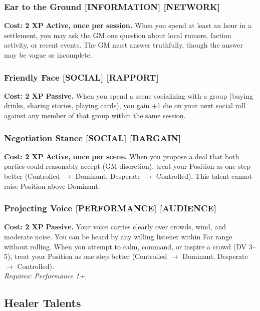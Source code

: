 \documentclass[12pt,a4paper]{book}
\begin{document}
\subsubsection*{Ear to the Ground \textnormal{[INFORMATION] [NETWORK]}}
\label{talent:ear-to-the-ground}
\textbf{Cost: 2 XP} \textbf{Active, once per session.} When you spend at least an hour in a settlement, you may ask the GM one question about local rumors, faction activity, or recent events. The GM must answer truthfully, though the answer may be vague or incomplete.

\subsubsection*{Friendly Face \textnormal{[SOCIAL] [RAPPORT]}}
\label{talent:friendly-face}
\textbf{Cost: 2 XP} \textbf{Passive.} When you spend a scene socializing with a group (buying drinks, sharing stories, playing cards), you gain +1 die on your next social roll against any member of that group within the same session.

\subsubsection*{Negotiation Stance \textnormal{[SOCIAL] [BARGAIN]}}
\label{talent:negotiation-stance}
\textbf{Cost: 2 XP} \textbf{Active, once per scene.} When you propose a deal that both parties could reasonably accept (GM discretion), treat your Position as one step better (Controlled $\rightarrow$ Dominant, Desperate $\rightarrow$ Controlled). This talent cannot raise Position above Dominant.

\subsubsection*{Projecting Voice \textnormal{[PERFORMANCE] [AUDIENCE]}}
\label{talent:projecting-voice}
\textbf{Cost: 2 XP} \textbf{Passive.} Your voice carries clearly over crowds, wind, and moderate noise. You can be heard by any willing listener within Far range without rolling. When you attempt to calm, command, or inspire a crowd (DV 3--5), treat your Position as one step better (Controlled $\rightarrow$ Dominant, Desperate $\rightarrow$ Controlled). \\
\textit{Requires: Performance 1+.}

\subsection*{Healer Talents}
\label{sec:minor-healer}
\end{document}
